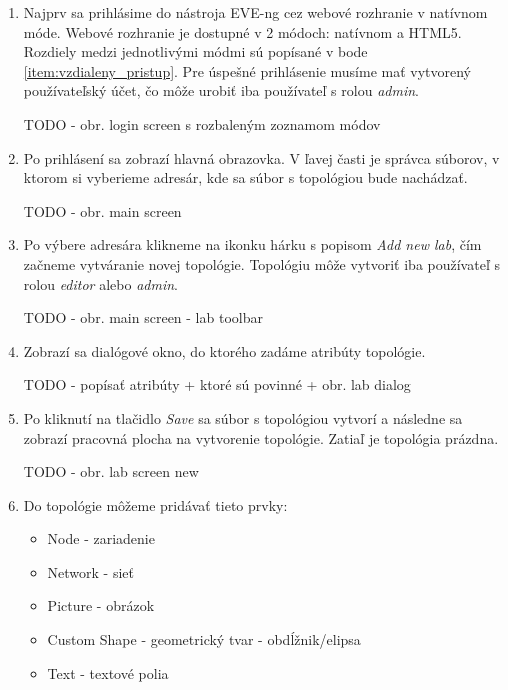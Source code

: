 \begin{enumerate}[noitemsep]

    \item Najprv sa prihlásime do nástroja EVE-ng cez webové rozhranie v natívnom móde. Webové rozhranie je dostupné v 2 módoch: natívnom a HTML5. Rozdiely medzi jednotlivými módmi sú popísané v bode \ref{item:vzdialeny_pristup}. Pre úspešné prihlásenie musíme mať vytvorený používateľský účet, čo môže urobiť iba používateľ s rolou \emph{admin}.

{\huge TODO - obr. login screen s rozbaleným zoznamom módov}

    \item Po prihlásení sa zobrazí hlavná obrazovka. V ľavej časti je správca súborov, v ktorom si vyberieme adresár, kde sa súbor s topológiou bude nachádzať.

{\huge TODO - obr. main screen}

    \item Po výbere adresára klikneme na ikonku hárku s popisom \emph{Add new lab}, čím začneme vytváranie novej topológie. Topológiu môže vytvoriť iba používateľ s rolou \emph{editor} alebo \emph{admin}.

{\huge TODO - obr. main screen - lab toolbar}

    \item Zobrazí sa dialógové okno, do ktorého zadáme atribúty topológie.
    
{\huge TODO - popísať atribúty + ktoré sú povinné + obr. lab dialog}

    \item Po kliknutí na tlačidlo \emph{Save} sa súbor s topológiou vytvorí a následne sa zobrazí pracovná plocha na vytvorenie topológie. Zatiaľ je topológia prázdna.
    
{\huge TODO - obr. lab screen new}

    \item Do topológie môžeme pridávať tieto prvky:
    
    \begin{itemize}[noitemsep]
        \item Node - zariadenie
        \item Network - sieť
        \item Picture - obrázok
        \item Custom Shape - geometrický tvar - obdĺžnik/elipsa
        \item Text - textové polia
    \end{itemize}
    

\end{enumerate}
